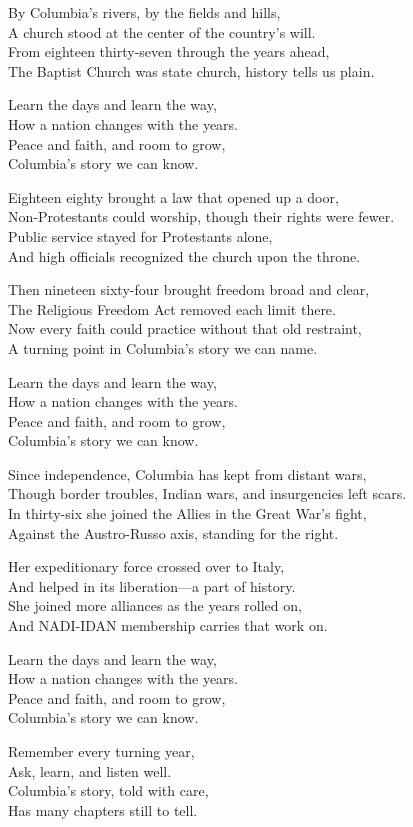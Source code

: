 \begin{lyrics}
By Columbia’s rivers, by the fields and hills,\\
A church stood at the center of the country’s will.\\
From eighteen thirty-seven through the years ahead,\\
The Baptist Church was state church, history tells us plain.

Learn the days and learn the way,\\
How a nation changes with the years.\\
Peace and faith, and room to grow,\\
Columbia’s story we can know.

Eighteen eighty brought a law that opened up a door,\\
Non-Protestants could worship, though their rights were fewer.\\
Public service stayed for Protestants alone,\\
And high officials recognized the church upon the throne.

Then nineteen sixty-four brought freedom broad and clear,\\
The Religious Freedom Act removed each limit there.\\
Now every faith could practice without that old restraint,\\
A turning point in Columbia’s story we can name.

Learn the days and learn the way,\\
How a nation changes with the years.\\
Peace and faith, and room to grow,\\
Columbia’s story we can know.

Since independence, Columbia has kept from distant wars,\\
Though border troubles, Indian wars, and insurgencies left scars.\\
In thirty-six she joined the Allies in the Great War’s fight,\\
Against the Austro-Russo axis, standing for the right.

Her expeditionary force crossed over to Italy,\\
And helped in its liberation—a part of history.\\
She joined more alliances as the years rolled on,\\
And NADI-IDAN membership carries that work on.

Learn the days and learn the way,\\
How a nation changes with the years.\\
Peace and faith, and room to grow,\\
Columbia’s story we can know.

Remember every turning year,\\
Ask, learn, and listen well.\\
Columbia’s story, told with care,\\
Has many chapters still to tell.
\end{lyrics}

